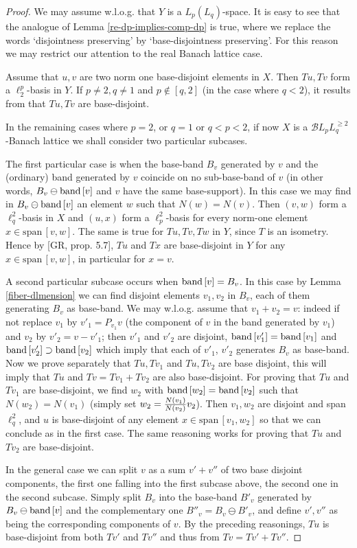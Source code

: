 \documentclass[11pt]{amsart}
\theoremstyle{plain}
\theoremstyle{remark}
\newcommand{\band}{{\rm band\,}}
\begin{document}
\begin{proof} We may assume w.l.o.g. that $Y$ is a $L_p(L_q)$-space. It is easy to see that the analogue of Lemma \ref{re-dp-implies-comp-dp} is true, where we replace the words `disjointness preserving' by `base-disjointness preserving'. For this reason we may restrict our attention to the real Banach lattice case.

Assume that $u,v$ are two norm one base-disjoint elements in $X$. Then $Tu,Tv$ form a 
 $\ell_2^p$-basis in $Y$.  If  $p\ne 2, q\ne 1$ and  $p\not\in [q,2]$ (in the case  where $q<2$),  it results from \cite[Prop. 5.6]{GR} that $Tu,Tv$ are base-disjoint. 
 
 In the remaining cases where $p=2$, or $q=1$ or $q<p<2$, if now $X$ is a $\mathcal BL_pL_q^{\ge 2}$-Banach lattice we shall consider two particular subcases.
 
The first particular case is when the base-band $B_v$ generated by $v$ and the (ordinary) band generated by $v$ coincide on no sub-base-band of $v$ (in other words, $B_v\ominus\band[v]$ and $v$ have the same base-support). In this case we may find in $B_v\ominus\band[v]$  an element $w$ such that $N(w)=N(v)$. Then $(v,w)$ form a $\ell_q^2$-basis in $X$ and $(u,x)$  form a $\ell_p^2$-basis for every norm-one element $x\in\mathrm{span}\,[v,w]$. The same is true for $Tu,Tv,Tw$ in $Y$, since $T$ is an isometry. Hence by [GR, prop. 5.7], $Tu$ and $Tx$ are base-disjoint in $Y$ for any $x\in\mathrm{span}\,[v,w]$, in particular for $x=v$.

A second  particular subcase occurs when $\band[v]=B_v$. In this case  by Lemma \ref{fiber-dlmension} we can find disjoint elements  $v_1,v_2$ in $B_v$, each of them generating $B_v$ as base-band. We may w.l.o.g. assume that $v_1+v_2=v$: indeed if not replace $v_1$ by $v'_1=P_{v_1}v$ (the component of $v$ in the band generated by $v_1$) and $v_2$ by $v'_2=v-v'_1$; then $v'_1$ and $v'_2$ are disjoint, $\band[v'_1]=\band[v_1]$ and $\band[v'_2]\supset \band[v_2]$ which imply that each of $v'_1$, $v'_2$ generates $B_v$ as base-band. Now we prove separately that $Tu,Tv_1$ and $Tu,Tv_2$ are base disjoint, this will imply that $Tu$ and $Tv=Tv_1+Tv_2$ are also base-disjoint.  For proving that $Tu$ and $Tv_1$ are base-disjoint, we find $w_2$ with $\band[w_2]=\band[v_2]$ such that $N(w_2)=N(v_1)$ (simply set $w_2={N(v_1)\over N(v_2)}v_2$). Then $v_1,w_2$ are disjoint and span $\ell_q^2$, and $u$ is base-disjoint of any element $x\in\mathrm{span}\,[v_1,w_2]$ so that we can conclude as in the first case. The same reasoning works for proving that $Tu$ and $Tv_2$ are base-disjoint.

In the general case we can split $v$ as a sum $v'+v''$ of two base disjoint components, the first one falling into the first subcase above, the second one in the second subcase. Simply split $B_v$ into the base-band $B'_v$ generated by $B_v\ominus \band[v]$ and the complementary one $B''_v=B_v\ominus B'_v$, and define $v',v''$ as being the corresponding components of $v$. By the preceding reasonings, $Tu$ is base-disjoint from both $Tv'$ and $Tv''$ and thus from $Tv=Tv'+Tv''$.
\end{proof}
\end{document}

